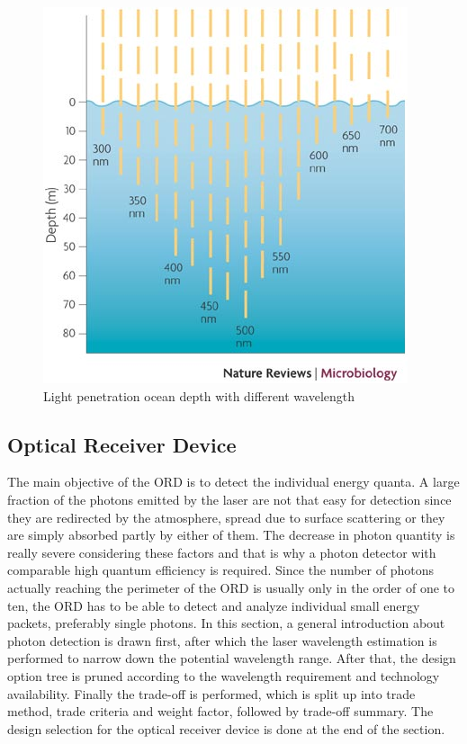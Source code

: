 \begin{figure}[ht!]
\centering
\includegraphics[scale = 0.7]{chapters/img/Ocean_absorption.jpg}
\caption{Light penetration ocean depth with different wavelength}
\label{fig:intro_ocean_penetrate}
\end{figure}

\subsection{Optical Receiver Device}
\label{TOORD}
The main objective of the \ac{ORD} is to detect the individual energy quanta. A large fraction of the photons emitted by the \acs{laser} are not that easy for detection since they are redirected by the atmosphere, spread due to surface scattering or they are simply absorbed partly by either of them. The decrease in photon quantity is really severe considering these factors and that is why a photon detector with comparable high quantum efficiency is required. Since the number of photons actually reaching the perimeter of the \ac{ORD} is usually only in the order of one to ten, the \acs{ORD} has to be able to detect and analyze individual small energy packets, preferably single photons. In this section, a general introduction about photon detection is drawn first, after which the \acs{laser} wavelength estimation is performed to narrow down the potential wavelength range. After that, the design option tree is pruned according to the wavelength requirement and technology availability. Finally the trade-off is performed, which is split up into trade method, trade criteria and weight factor, followed by trade-off summary. The design selection for the optical receiver device is done at the end of the section.

